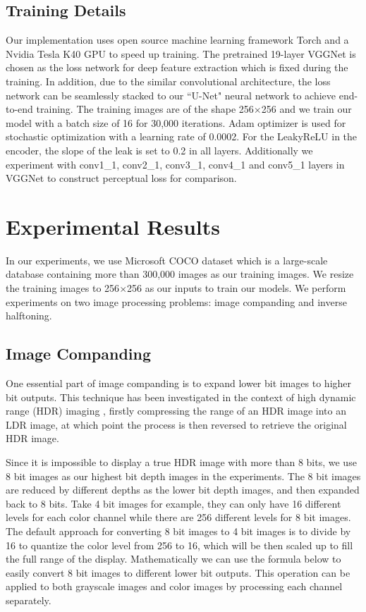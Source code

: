 \documentclass[journal]{IEEEtran}
\begin{document}
\subsection{Training Details}
Our implementation uses open source machine learning framework Torch \cite{collobert2011torch7} and a Nvidia Tesla K40 GPU to speed up training. The pretrained 19-layer VGGNet \cite{simonyan2014very} is chosen as the loss network for deep feature extraction which is fixed during the training. In addition, due to the similar convolutional architecture, the loss network can be seamlessly stacked to our ``U-Net" neural network to achieve end-to-end training. The training images are of the shape 256$\times$256 and we train our model with a batch size of 16 for 30,000 iterations. Adam optimizer \cite{kingma2014adam} is used for stochastic optimization with a learning rate of 0.0002. For the LeakyReLU in the encoder, the slope of the leak is set to 0.2 in all layers. Additionally we experiment with conv1\_1, conv2\_1, conv3\_1, conv4\_1 and conv5\_1 layers in VGGNet to construct perceptual loss for comparison.

\section{Experimental Results}
In our experiments, we use Microsoft COCO dataset \cite{lin2014microsoft} which is a large-scale database containing more than 300,000 images as our training images. We resize the training images to 256$\times$256 as our inputs to train our models. We perform experiments on two image processing problems: image companding and inverse halftoning.



\subsection{Image Companding}
One essential part of image companding is to expand lower bit images to higher bit outputs. This technique has been investigated in the context of high dynamic range (HDR) imaging \cite{li2005compressing}, firstly compressing the range of an HDR image into an LDR image, at which point the process is then reversed to retrieve the original HDR image.

Since it is impossible to display a true HDR image with more than 8 bits, we use 8 bit images as our highest bit depth images in the experiments. The 8 bit images are reduced by different depths as the lower bit depth images, and then expanded back to 8 bits. Take 4 bit images for example, they can only have 16 different levels for each color channel while there are 256 different levels for 8 bit images. The default approach \cite{li2005compressing} for converting 8 bit images to 4 bit images is to divide by 16 to quantize the color level from 256 to 16, which will be then scaled up to fill the full range of the display. Mathematically we can use the formula below to easily convert 8 bit images to different lower bit outputs. This operation can be applied to both grayscale images and color images by processing each channel separately.
\end{document}
